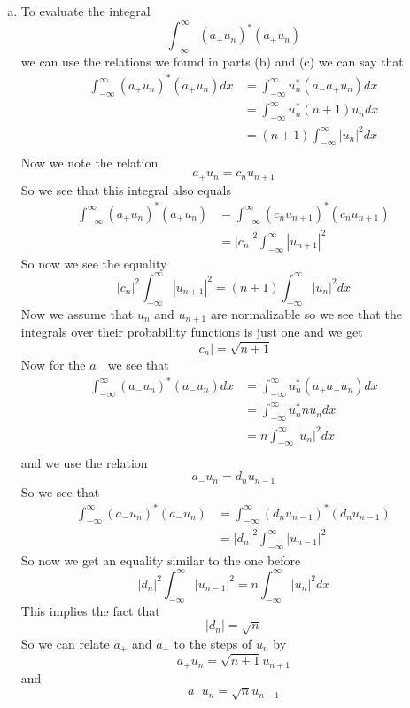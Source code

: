 \documentclass[11pt]{article}
\numberwithin{equation}{section}
\begin{document}
\begin{enumerate}[(a)]
\item
To evaluate the integral 
$$\int_{-\infty}^{\infty}(a_+u_n)^*(a_+u_n)$$
we can use the relations we found in parts (b) and (c) we can say that
\begin{align*}
\int_{-\infty}^{\infty}(a_+u_n)^*(a_+u_n)dx &= \int_{-\infty}^{\infty}u_n^*(a_-a_+u_n)dx\\
&= \int_{-\infty}^{\infty}u_n^*(n+1)u_ndx\\
&= (n+1)\int_{-\infty}^{\infty}|u_n|^2dx\\
\end{align*}
Now we note the relation 
$$a_+u_n = c_nu_{n+1}$$
So we see that this integral also equals 
\begin{align*}
\int_{-\infty}^{\infty}(a_+u_n)^*(a_+u_n) &=  \int_{-\infty}^{\infty}(c_nu_{n+1})^*(c_nu_{n+1})\\
&=  |c_n|^2\int_{-\infty}^{\infty}|u_{n+1}|^2
\end{align*}
So now we see the equality 
$$|c_n|^2\int_{-\infty}^{\infty}|u_{n+1}|^2 = (n+1)\int_{-\infty}^{\infty}|u_n|^2dx$$
Now we assume that $u_n$ and $u_{n+1}$ are normalizable so we see that the integrals over their probability functions is just one and we get
$$|c_n| = \sqrt{n+1}$$
Now for the $a_-$ we see that
\begin{align*}
\int_{-\infty}^{\infty}(a_-u_n)^*(a_-u_n)dx &= \int_{-\infty}^{\infty}u_n^*(a_+a_-u_n)dx\\
&= \int_{-\infty}^{\infty}u_n^*nu_ndx\\
&= n\int_{-\infty}^{\infty}|u_n|^2dx\\
\end{align*}
and we use the relation
$$a_-u_n = d_nu_{n-1}$$
So we see that
\begin{align*}
\int_{-\infty}^{\infty}(a_-u_n)^*(a_-u_n) &=  \int_{-\infty}^{\infty}(d_nu_{n-1})^*(d_nu_{n-1})\\
&=  |d_n|^2\int_{-\infty}^{\infty}|u_{n-1}|^2
\end{align*}
So now we get an equality similar to the one before
$$|d_n|^2\int_{-\infty}^{\infty}|u_{n-1}|^2 = n\int_{-\infty}^{\infty}|u_n|^2dx$$
This implies the fact that
$$|d_n| = \sqrt{n}$$
So we can relate $a_+$ and $a_-$ to the steps of $u_n$ by
$$a_+u_n = \sqrt{n+1}u_{n+1}$$
and
$$a_-u_n = \sqrt{n}u_{n-1}$$

\end{enumerate}
\end{document}
